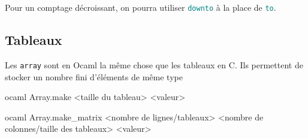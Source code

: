 \documentclass{scrartcl}
\begin{document}
			\rem Pour un comptage décroissant, on pourra utiliser \textcolor{teal}{\texttt{downto}} à la place de \textcolor{teal}{\texttt{to}}.

		\subsection{Tableaux}
			Les \texttt{array} sont en Ocaml la même chose que les tableaux en C. Ils permettent de stocker un nombre fini d'éléments de même type
			\begin{code}{ocaml}
				Array.make <taille du tableau> <valeur>
			\end{code}

			\begin{code}{ocaml}
				Array.make_matrix <nombre de lignes/tableaux> <nombre de colonnes/taille des tableaux> <valeur>
			\end{code}
\end{document}
